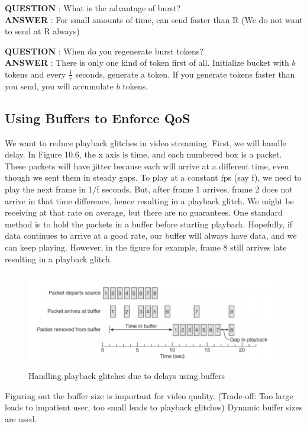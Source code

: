 \documentclass[twoside]{article}
\begin{document}
 
\textbf{QUESTION} : What is the advantage of burst?\\
\textbf{ANSWER} : For small amounts of time, can send faster than R (We do not want to send at R always)

\textbf{QUESTION} : When do you regenerate burst tokens?\\
\textbf{ANSWER} : There is only one kind of token first of all. Initialize bucket with $b$ tokens and every $\frac{1}{r}$ seconds, generate a token. If you generate tokens faster than you send, you will accumulate $b$ tokens.   

\subsection{Using Buffers to Enforce QoS}
We want to reduce playback glitches in video streaming. First, we will handle delay. In Figure 10.6, the x axis is time, and each numbered box is a packet. These packets will have jitter because each will arrive at a different time, even though we sent them in steady gaps. To play at a constant fps (say f), we need to play the next frame in 1/f seconds. But, after frame 1 arrives, frame 2 does not arrive in that time difference, hence resulting in a playback glitch. We might be receiving at that rate on average, but there are no guarantees. One standard method is to hold the packets in a buffer before starting playback. Hopefully, if data continues to arrive at a good rate, our buffer will always have data, and we can keep playing. However, in the figure for example, frame 8 still arrives late resulting in a playback glitch.
\begin{figure}[t]
\includegraphics[scale=0.5]{playback.png}
\centering
\caption{Handling playback glitches due to delays using buffers}
\end{figure}


Figuring out the buffer size is important for video quality. (Trade-off: Too large leads to impatient user, too small leads to playback glitches)
Dynamic buffer sizes are used.
\end{document}
